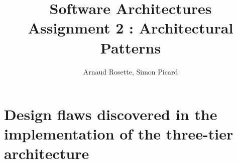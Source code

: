 \documentclass[a4paper,10pt]{article}
\title{Software Architectures\\ Assignment 2 : Architectural Patterns}
\author{Arnaud Rosette, Simon Picard}
\begin{document}
\maketitle

\section{Design flaws discovered in the implementation of the three-tier architecture}
\end{document}

